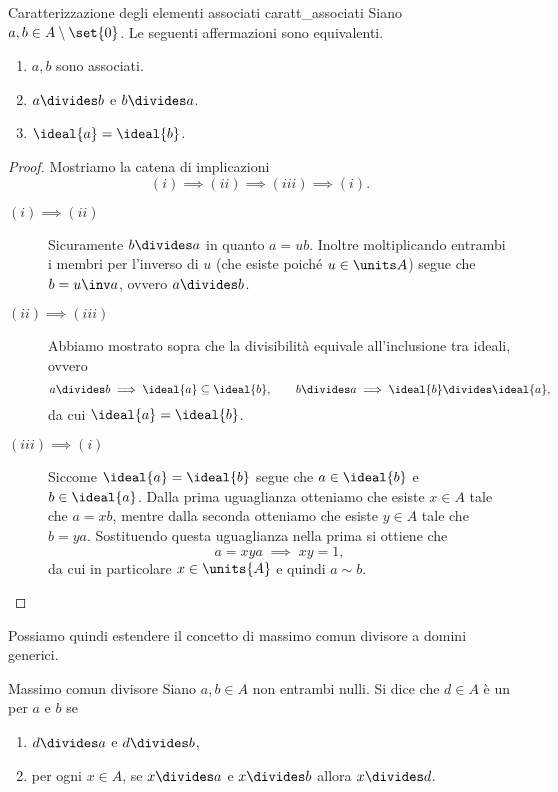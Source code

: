 \begin{proposition}
    {Caratterizzazione degli elementi associati}
    {caratt_associati}
    Siano $a, b \in A \setminus \set{0}$. Le seguenti affermazioni sono equivalenti.
    \begin{enumerate}[label=({\roman*})]
        \item $a, b$ sono associati.
        \item $a \divides b$ e $b \divides a$.
        \item $\ideal{a} = \ideal{b}$.
    \end{enumerate}
\end{proposition}
\begin{proof}
    Mostriamo la catena di implicazioni \[
        (i) \implies (ii) \implies (iii) \implies (i).    
    \]
    \begin{description}
        \item[$(i) \implies (ii)$] Sicuramente $b \divides a$ in quanto $a = ub$. Inoltre moltiplicando entrambi i membri per l'inverso di $u$ (che esiste poiché $u \in \units A$) segue che $b = u\inv a$, ovvero $a \divides b$.
        \item[$(ii) \implies (iii)$] Abbiamo mostrato sopra che la divisibilità equivale all'inclusione tra ideali, ovvero \[
            a \divides b \implies \ideal{a} \subseteq \ideal{b}, \qquad b \divides a \implies \ideal{b} \divides \ideal{a},    
        \] da cui $\ideal{a} = \ideal{b}$.
        \item[$(iii) \implies (i)$] Siccome $\ideal{a} = \ideal{b}$ segue che $a \in \ideal{b}$ e $b \in \ideal{a}$. Dalla prima uguaglianza otteniamo che esiste $x \in A$ tale che $a = xb$, mentre dalla seconda otteniamo che esiste $y \in A$ tale che $b = ya$. Sostituendo questa uguaglianza nella prima si ottiene che \[
            a = xya \;\implies\; xy = 1,
        \] da cui in particolare $x \in \units{A}$ e quindi $a \sim b$.
    \end{description}
\end{proof}

Possiamo quindi estendere il concetto di massimo comun divisore a domini generici.
\begin{definition}
    {Massimo comun divisore}{}
    Siano $a, b \in A$ non entrambi nulli. Si dice che $d \in A$ è un  per $a$ e $b$ se \begin{enumerate}[label={(\roman*)}]
        \item $d \divides a$ e $d \divides b$,
        \item per ogni $x \in A$, se $x \divides a$ e $x \divides b$ allora $x \divides d$.
    \end{enumerate}
\end{definition}

